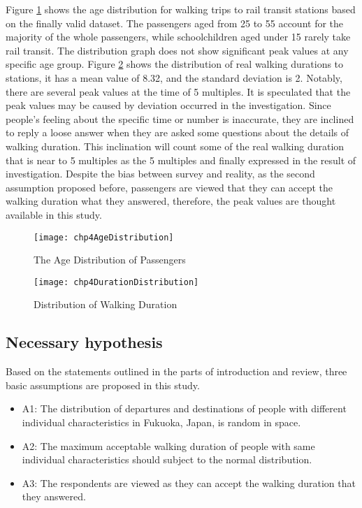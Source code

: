 %
Figure \ref{fig:chp4:AgeDistribution} shows the age distribution for walking trips to rail transit stations based on the finally valid dataset. The passengers aged from 25 to 55 account for the majority of the whole passengers, while schoolchildren aged under 15 rarely take rail transit. The distribution graph does not show significant peak values at any specific age group. Figure \ref{fig:chp4:DurationDistribution} shows the distribution of real walking durations to stations, it has a mean value of 8.32, and the standard deviation is 2. Notably, there are several peak values at the time of 5 multiples. It is speculated that the peak values may be caused by deviation occurred in the investigation. Since people's feeling about the specific time or number is inaccurate, they are inclined to reply a loose answer when they are asked some questions about the details of walking duration. This inclination will count some of the real walking duration that is near to 5 multiples as the 5 multiples and finally expressed in the result of investigation. Despite the bias between survey and reality, as the second assumption proposed before, passengers are viewed that they can accept the walking duration what they answered, therefore, the peak values are thought available in this study.

\begin{figure}[htp]
	\caption{The Age Distribution of Passengers}
	\label{fig:chp4:AgeDistribution}
	\centering
	\texttt{[image: chp4AgeDistribution]}
\end{figure}

\begin{figure}[htp]
	\caption{Distribution of Walking Duration}
	\label{fig:chp4:DurationDistribution}
	\centering
	\texttt{[image: chp4DurationDistribution]}
\end{figure}

%
\subsection{Necessary hypothesis}
Based on the statements outlined in the parts of introduction and review, three basic assumptions are proposed in this study.

\begin{itemize}
	\item A1: The distribution of departures and destinations of people with different individual characteristics in Fukuoka, Japan, is random in space. 
	
	\item A2: The maximum acceptable walking duration of people with same individual characteristics should subject to the normal distribution. 
	
	\item A3: The respondents are viewed as they can accept the walking duration that they answered.
\end{itemize}

